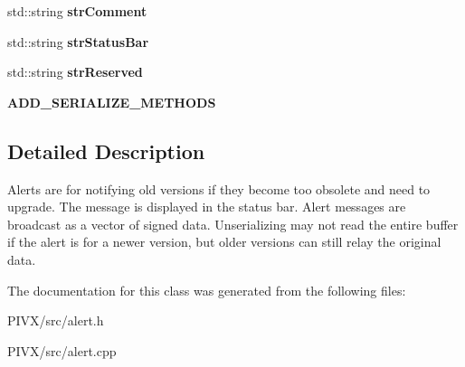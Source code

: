 \begin{DoxyCompactItemize}
std\+::string {\bfseries str\+Comment}
\item 
\mbox{\label{class_c_unsigned_alert_a97cfbf9a49b770bb84e49389ac1489c2}} 
std\+::string {\bfseries str\+Status\+Bar}
\item 
\mbox{\label{class_c_unsigned_alert_a0115109fd39d48f37a412d5f50a78828}} 
std\+::string {\bfseries str\+Reserved}
\item 
\mbox{\label{class_c_unsigned_alert_a24489988876bbf2c38a5f379e4057a53}} 
{\bfseries A\+D\+D\+\_\+\+S\+E\+R\+I\+A\+L\+I\+Z\+E\+\_\+\+M\+E\+T\+H\+O\+DS}
\end{DoxyCompactItemize}


\subsection{Detailed Description}
Alerts are for notifying old versions if they become too obsolete and need to upgrade. The message is displayed in the status bar. Alert messages are broadcast as a vector of signed data. Unserializing may not read the entire buffer if the alert is for a newer version, but older versions can still relay the original data. 

The documentation for this class was generated from the following files\+:\begin{DoxyCompactItemize}
\item 
P\+I\+V\+X/src/alert.\+h\item 
P\+I\+V\+X/src/alert.\+cpp\end{DoxyCompactItemize}
